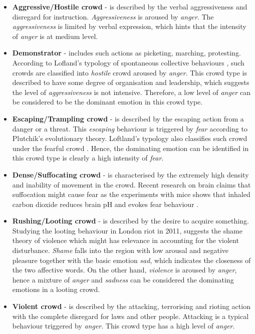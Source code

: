 \begin{itemize}
\item \textbf{Aggressive/Hostile crowd} - is described by the verbal aggressiveness and disregard for instruction. \textit{Aggressiveness} is aroused by \textit{anger}. The \textit{aggressiveness} is limited by verbal expression, which hints that the intensity of \textit{anger} is at medium level.
\item \textbf{Demonstrator} - includes such actions as picketing, marching, protesting. According to Lofland's typology of spontaneous collective behaviours \citep{Kornblum2011}, such crowds are classified into \textit{hostile} crowd aroused by \textit{anger}. This crowd type is described to have some degree of organisation and leadership, which suggests the level of \textit{aggressiveness} is not intensive. Therefore, a low level of \textit{anger} can be considered to be the dominant emotion in this crowd type.
\item \textbf{Escaping/Trampling crowd} - is described by the escaping action from a danger or a threat. This \textit{escaping} behaviour is triggered by \textit{fear} according to Plutchik's evolutionary theory. Loftland's typology also classifies such crowd under the fearful crowd \cite{Kornblum2011}. Hence, the dominating emotion can be identified in this crowd type is clearly a high intensity of \textit{fear}.
\item \textbf{Dense/Suffocating crowd} - is characterised by the extremely high density and inability of movement in the crowd. Recent research on brain claims that suffocation might cause fear as the experiments with mice shows that inhaled carbon dioxide reduces brain pH and evokes fear behaviour \citep{ziemann2009amygdala}.
\item \textbf{Rushing/Looting crowd} - is described by the desire to acquire something. Studying the looting behaviour in London riot in 2011, \citet{ray2014shame} suggests the shame theory of violence which might has relevance in accounting for the violent disturbance. \textit{Shame} falls into the region with low arousal and negative pleasure together with the basic emotion \textit{sad}, which indicates the closeness of the two affective words. On the other hand, \textit{violence} is aroused by \textit{anger}, hence a mixture of \textit{anger} and \textit{sadness} can be considered the dominating emotions in a looting crowd.
\item \textbf{Violent crowd} - is described by the attacking, terrorising and rioting action with the complete disregard for laws and other people. Attacking is a typical behaviour triggered by \textit{anger}. This crowd type has a high level of \textit{anger}.
\end{itemize}

